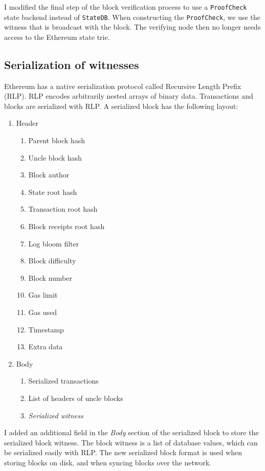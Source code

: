 \documentclass[12pt]{article}
\begin{document}
I modified the final step of the block verification process to use a \texttt{ProofCheck} state backend instead of \texttt{StateDB}. When constructing the \texttt{ProofCheck}, we use the witness that is broadcast with the block. The verifying node then no longer needs access to the Ethereum state trie.

\subsection{Serialization of witnesses}
Ethereum has a native serialization protocol called Recursive Length Prefix (RLP). RLP encodes arbitrarily nested arrays of binary data. Transactions and blocks are serialized with RLP. A serialized block has the following layout:
\begin{enumerate}
  \item Header
  \begin{enumerate}
    \item Parent block hash
    \item Uncle block hash
    \item Block author
    \item State root hash
    \item Transaction root hash
    \item Block receipts root hash
    \item Log bloom filter
    \item Block difficulty
    \item Block number
    \item Gas limit
    \item Gas used
    \item Timestamp
    \item Extra data
  \end{enumerate}
  \item Body
  \begin{enumerate}
    \item Serialized transactions
    \item List of headers of uncle blocks
    \item \emph{Serialized witness}
  \end{enumerate}
\end{enumerate}

I added an additional field in the \emph{Body} section of the serialized block to store the serialized block witness. The block witness is a list of database values, which can be serialized easily with RLP. The new serialized block format is used when storing blocks on disk, and when syncing blocks over the network.
\end{document}
